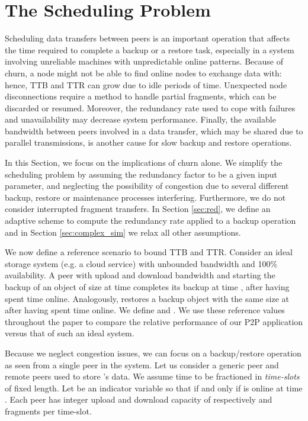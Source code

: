 \documentclass[conference,10pt]{IEEEtran}
\begin{document}
\section{The Scheduling Problem}
\label{sec:scheduling}

Scheduling data transfers between peers is an important operation that
affects the time required to complete a backup or a restore task,
especially in a system involving unreliable machines with
unpredictable online patterns. Because of churn, a node might not be
able to find online nodes to exchange data with: hence, TTB and TTR
can grow due to idle periods of time. Unexpected node disconnections
require a method to handle partial fragments, which can be discarded
or resumed.  Moreover, the redundancy rate used to cope with failures
and unavailability may decrease system performance. Finally, the
available bandwidth between peers involved in a data transfer, which
may be shared due to parallel transmissions, is another cause for slow
backup and restore operations.

In this Section, we focus on the implications of churn alone. We
simplify the scheduling problem by assuming the redundancy factor to
be a given input parameter, and neglecting the possibility of
congestion due to several different backup, restore or maintenance
processes interfering. Furthermore, we do not consider interrupted
fragment transfers. In Section \ref{sec:red}, we define an adaptive
scheme to compute the redundancy rate applied to a backup operation
and in Section \ref{sec:complex_sim} we relax all other assumptions.

We now define a reference scenario to bound TTB and TTR. Consider an
ideal storage system (e.g. a cloud service) with unbounded bandwidth
and 100\% availability. A peer  with upload and download bandwidth
 and  starting the backup of an object of size  at time
 completes its backup at time , after having spent  time online. Analogously,  restores a backup object with the
same size at  after having spent  time online. We
define  and . We use these
reference values throughout the paper to compare the relative
performance of our P2P application versus that of such an ideal
system.


Because we neglect congestion issues, we can focus on a backup/restore
operation as seen from a single peer in the system. Let us consider a
generic peer  and  remote peers  used to
store 's data. We assume time to be fractioned
in \emph{time-slots} of fixed length. Let  be an indicator
variable so that  if and only if  is online at time
. Each peer  has integer upload and download capacity of
respectively  and  fragments per time-slot.
\end{document}
